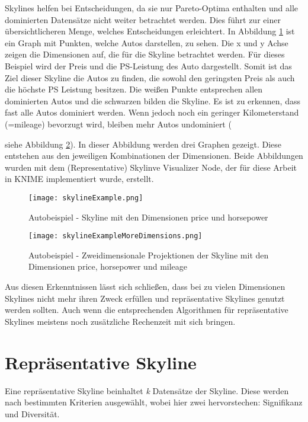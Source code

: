 Skylines helfen bei Entscheidungen, da sie nur Pareto-Optima enthalten und alle dominierten Datensätze nicht weiter betrachtet werden. Dies führt zur einer übersichtlicheren Menge, welches Entscheidungen erleichtert.
In Abbildung \ref{img:skylineExample} ist ein Graph mit Punkten, welche Autos darstellen, zu sehen. Die x und y Achse zeigen die Dimensionen auf, die für die Skyline betrachtet werden. Für dieses Beispiel wird der Preis und die PS-Leistung des Auto dargestellt. Somit ist das Ziel dieser Skyline die Autos zu finden, die sowohl den geringsten Preis als auch die höchste PS Leistung besitzen.
Die weißen Punkte entsprechen allen dominierten Autos und die schwarzen bilden die Skyline. Es ist zu erkennen, dass fast alle Autos dominiert werden. Wenn jedoch noch ein geringer Kilometerstand (=mileage) bevorzugt wird, bleiben mehr Autos undominiert ({siehe Abbildung \ref{img:skylineExampleMoreDimensions}). In dieser Abbildung werden drei Graphen gezeigt. Diese entstehen aus den jeweiligen Kombinationen der Dimensionen. Beide Abbildungen wurden mit dem (Representative) Skylinve Visualizer Node, der für diese Arbeit in KNIME implementiert wurde, erstellt.

\begin{figure}[H]
	\centering
	\texttt{[image: skylineExample.png]}
	\caption{Autobeispiel - Skyline mit den Dimensionen price und horsepower}
	\label{img:skylineExample}
\end{figure}


\begin{figure}[H]
	\centering
    \texttt{[image: skylineExampleMoreDimensions.png]}
	\caption{Autobeispiel - Zweidimensionale Projektionen der Skyline mit den Dimensionen price, horsepower und mileage}
	\label{img:skylineExampleMoreDimensions}
\end{figure}

Aus diesen Erkenntnissen lässt sich schließen, dass bei zu vielen Dimensionen Skylines nicht mehr ihren Zweck erfüllen und repräsentative Skylines genutzt werden sollten. Auch wenn die entsprechenden Algorithmen für repräsentative Skylines meistens noch zusätzliche Rechenzeit mit sich bringen.
\section{Repräsentative Skyline}
\label{ch:Grundlagen:sec:repSkyline}
Eine repräsentative Skyline beinhaltet \textit{k} Datensätze der Skyline. Diese werden nach bestimmten Kriterien ausgewählt, wobei hier zwei hervorstechen: Signifikanz und Diversität.

}
